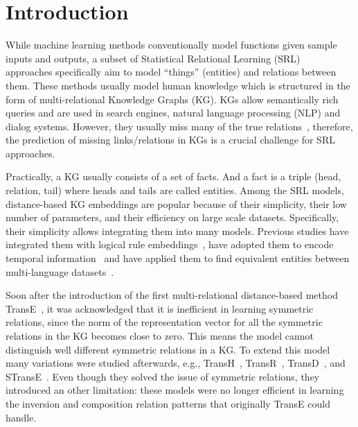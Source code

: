 \documentclass{ecai}
\begin{document}
\section{Introduction}
While machine learning methods conventionally model functions given sample inputs and outputs, a subset of Statistical Relational Learning (SRL)~\cite{de2008logical,nickel2015review} approaches specifically aim to model ``things'' (entities) and relations between them. These methods usually model human knowledge which is structured in the form of multi-relational Knowledge Graphs (KG). KGs allow semantically rich queries and are used in search engines, natural language processing (NLP) and dialog systems. However, they usually miss many of the true relations~\cite{west2014knowledge}, therefore, the prediction of missing links/relations in KGs is a crucial challenge for SRL approaches.  

Practically, a KG usually consists of a set of facts. And a fact is a triple (head, relation, tail) where heads and tails are called entities.
Among the SRL models, distance-based KG embeddings are popular because of their simplicity, their low number of parameters, and their efficiency on large scale datasets. Specifically, their simplicity allows integrating them into many models. Previous studies have integrated them with logical rule embeddings~\cite{guo2016jointly}, have adopted them to encode temporal information~\cite{jiang2016encoding} and have applied them to find equivalent entities between multi-language datasets~\cite{kgmerging}. 

Soon after the introduction of the first multi-relational distance-based method TransE~\cite{bordes2013translating}, it was acknowledged that it is inefficient in learning symmetric relations, since the norm of the representation vector for all the symmetric relations in the KG becomes close to zero. This means the model cannot distinguish well different symmetric relations in a KG. 
To extend this model many variations were studied afterwards, e.g., TransH~\cite{wang2014knowledgeTransH}, 
TransR~\cite{lin2015learningTransR}, TransD~\cite{ji2015knowledgeTransD}, and STransE~\cite{StransE}. 
Even though they solved the issue of symmetric relations, they introduced an other limitation: these models were no longer efficient in learning the inversion and composition relation patterns that originally TransE could handle. 
 
\end{document}
